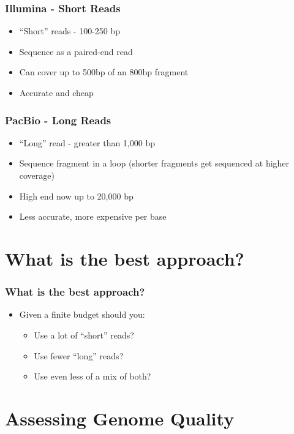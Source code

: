 \documentclass[14pt,handout]{beamer}
\begin{document}
\begin{frame}
\frametitle{Illumina - Short Reads}
\begin{itemize}
	\item<+-> ``Short'' reads - 100-250 bp
	\item<+-> Sequence as a paired-end read
	\item<+-> Can cover up to 500bp of an 800bp fragment
	\item<+-> Accurate and cheap
\end{itemize}
\end{frame}

\begin{frame}
\frametitle{PacBio - Long Reads}
\begin{itemize}
	\item<+-> ``Long'' read - greater than 1,000 bp
	\item<+-> Sequence fragment in a loop (shorter fragments get sequenced at higher coverage)
	\item<+-> High end now up to 20,000 bp
	\item<+-> Less accurate, more expensive per base
\end{itemize}
\end{frame}

\section{What is the best approach?}

\begin{frame}
\frametitle{What is the best approach?}
\begin{itemize}
	\item<+-> Given a finite budget should you:
	\begin{itemize}
		\item<+-> Use a lot of ``short'' reads?
		\item<+-> Use fewer ``long'' reads?
		\item<+-> Use even less of a mix of both?
	\end{itemize}
\end{itemize}
\end{frame}

\section{Assessing Genome Quality}
\end{document}
